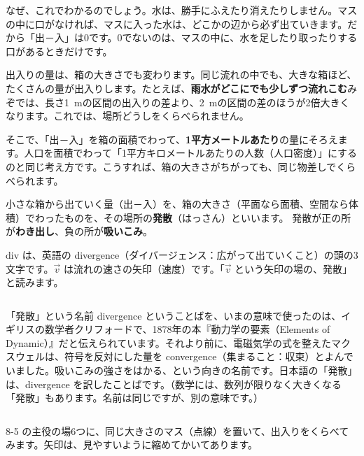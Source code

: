 なぜ、これでわかるのでしょう。水は、勝手にふえたり消えたりしません。マスの中に口がなければ、マスに入った水は、どこかの辺から必ず出ていきます。だから「\mbox{出－入}」は0です。0でないのは、マスの中に、水を足したり取ったりする口があるときだけです。

出入りの量は、箱の大きさでも変わります。同じ流れの中でも、大きな箱ほど、たくさんの量が出入りします。たとえば、\textbf{雨水がどこにでも少しずつ流れこむ}みぞでは、長さ\qty{1}{m}の区間の出入りの差より、\qty{2}{m}の区間の差のほうが2倍大きくなります。これでは、場所どうしをくらべられません。

そこで、「\mbox{出－入}」を箱の面積でわって、\textbf{1平方メートルあたり}の量にそろえます。人口を面積でわって「1平方キロメートルあたりの人数（人口密度）」にするのと同じ考え方です。こうすれば、箱の大きさがちがっても、同じ物差しでくらべられます。

\begin{taisetsu}
小さな箱から出ていく量（\mbox{出－入}）を、箱の大きさ（平面なら面積、空間なら体積）でわったものを、その場所の\textbf{発散}（はっさん）といいます。
発散が正の所が\textbf{わき出し}、負の所が\textbf{吸いこみ}。
\end{taisetsu}

$\mathrm{div}$ は、英語の divergence（ダイバージェンス：広がって出ていくこと）の頭の3文字です。$\vec v$ は流れの速さの矢印（速度）です。「$\vec v$ という矢印の場の、発散」と読みます。

\begin{column}{「発散」という名前}
divergence ということばを、いまの意味で使ったのは、イギリスの数学者クリフォードで、1878年の本『動力学の要素（Elements of Dynamic）』だと伝えられています。それより前に、電磁気学の式を整えたマクスウェルは、符号を反対にした量を convergence（集まること：収束）とよんでいました。吸いこみの強さをはかる、という向きの名前です。日本語の「発散」は、divergence を訳したことばです。（数学には、数列が限りなく大きくなる「発散」もあります。名前は同じですが、別の意味です。）
\end{column}


\label{bk:8-9:kuraberu}8-5 の主役の場6つに、同じ大きさのマス（点線）を置いて、出入りをくらべてみます。矢印は、見やすいように縮めてかいてあります。

